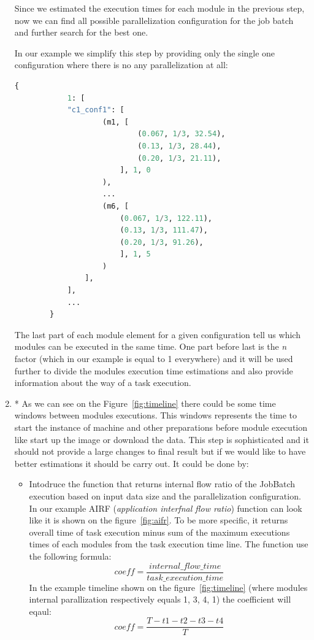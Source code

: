 \documentclass{article}
\begin{document}
\begin{enumerate}
		Since we estimated the execution times for each module in the previous step, now we can find all possible parallelization configuration for the job batch and further search for the best one.
		
		In our example we simplify this step by providing only the single one configuration where there is no any parallelization at all:
		\begin{lstlisting}[language=Python]
		{
			1: [
			"c1_conf1": [
					(m1, [
							(0.067, 1/3, 32.54),
							(0.13, 1/3, 28.44),
							(0.20, 1/3, 21.11),
						], 1, 0
					),
					...
					(m6, [
						(0.067, 1/3, 122.11),
						(0.13, 1/3, 111.47),
						(0.20, 1/3, 91.26),
						], 1, 5
					)
				],
			],
			...
		}
		\end{lstlisting}
		The last part of each module element for a given configuration tell us which modules can be executed in the same time. One part before last is the \textit{n} factor (which in our example is equal to 1 everywhere) and it will be used further to divide the modules execution time estimations and also provide information about the way of a task execution.
		\item* As we can see on the Figure~\ref{fig:timeline} there could be some time windows between modules executions. This windows represents the time to start the instance of machine and other preparations before module execution like start up the image or download the data. This step is sophisticated and it should not provide a large changes to final result but if we would like to have better estimations it should be carry out. It could be done by:
		
		\begin{itemize}
			\item Intodruce the function that returns internal flow ratio of the JobBatch execution based on input data size and the parallelization configuration. In our example AIRF (\textit{application interfnal flow ratio}) function can look like it is shown on the figure~\ref{fig:aifr}. To be more specific, it returns overall time of task execution minus sum of the maximum executions times of each modules from the task execution time line. The function use the following formula:
			\begin{equation}
			coeff =  \frac{internal\_flow\_time}{task\_execution\_time }
			\end{equation}
			In the example timeline shown on the figure~\ref{fig:timeline} (where modules internal parallization respectively equals 1, 3, 4, 1) the coefficient will eqaul:
			\begin{equation}
			coeff =  \frac{T - t1 - t2 - t3 - t4}{T}
			\end{equation}
			

\end{itemize}
\end{enumerate}
\end{document}
